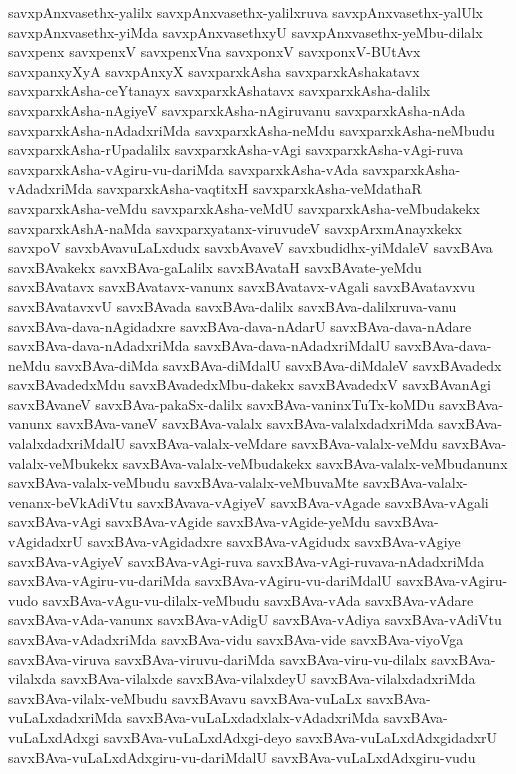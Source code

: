 {savxpAnxvasethx-yalilx
savxpAnxvasethx-yalilxruva
savxpAnxvasethx-yalUlx
savxpAnxvasethx-yiMda
savxpAnxvasethxyU
savxpAnxvasethx-yeMbu-dilalx
savxpenx
savxpenxV
savxpenxVna
savxponxV
savxponxV-BUtAvx
savxpanxyXyA
savxpAnxyX
savxparxkAsha
savxparxkAshakatavx
savxparxkAsha-ceYtanayx
savxparxkAshatavx
savxparxkAsha-dalilx
savxparxkAsha-nAgiyeV
savxparxkAsha-nAgiruvanu
savxparxkAsha-nAda
savxparxkAsha-nAdadxriMda
savxparxkAsha-neMdu
savxparxkAsha-neMbudu
savxparxkAsha-rUpadalilx
savxparxkAsha-vAgi
savxparxkAsha-vAgi-ruva
savxparxkAsha-vAgiru-vu-dariMda
savxparxkAsha-vAda
savxparxkAsha-vAdadxriMda
savxparxkAsha-vaqtitxH
savxparxkAsha-veMdathaR
savxparxkAsha-veMdu
savxparxkAsha-veMdU
savxparxkAsha-veMbudakekx
savxparxkAshA-naMda
savxparxyatanx-viruvudeV
savxpArxmAnayxkekx
savxpoV
savxbAvavuLaLxdudx
savxbAvaveV
savxbudidhx-yiMdaleV
savxBAva
savxBAvakekx
savxBAva-gaLalilx
savxBAvataH
savxBAvate-yeMdu
savxBAvatavx
savxBAvatavx-vanunx
savxBAvatavx-vAgali
savxBAvatavxvu
savxBAvatavxvU
savxBAvada
savxBAva-dalilx
savxBAva-dalilxruva-vanu
savxBAva-dava-nAgidadxre
savxBAva-dava-nAdarU
savxBAva-dava-nAdare
savxBAva-dava-nAdadxriMda
savxBAva-dava-nAdadxriMdalU
savxBAva-dava-neMdu
savxBAva-diMda
savxBAva-diMdalU
savxBAva-diMdaleV
savxBAvadedx
savxBAvadedxMdu
savxBAvadedxMbu-dakekx
savxBAvadedxV
savxBAvanAgi
savxBAvaneV
savxBAva-pakaSx-dalilx
savxBAva-vaninxTuTx-koMDu
savxBAva-vanunx
savxBAva-vaneV
savxBAva-valalx
savxBAva-valalxdadxriMda
savxBAva-valalxdadxriMdalU
savxBAva-valalx-veMdare
savxBAva-valalx-veMdu
savxBAva-valalx-veMbukekx
savxBAva-valalx-veMbudakekx
savxBAva-valalx-veMbudanunx
savxBAva-valalx-veMbudu
savxBAva-valalx-veMbuvaMte
savxBAva-valalx-venanx-beVkAdiVtu
savxBAvava-vAgiyeV
savxBAva-vAgade
savxBAva-vAgali
savxBAva-vAgi
savxBAva-vAgide
savxBAva-vAgide-yeMdu
savxBAva-vAgidadxrU
savxBAva-vAgidadxre
savxBAva-vAgidudx
savxBAva-vAgiye
savxBAva-vAgiyeV
savxBAva-vAgi-ruva
savxBAva-vAgi-ruvava-nAdadxriMda
savxBAva-vAgiru-vu-dariMda
savxBAva-vAgiru-vu-dariMdalU
savxBAva-vAgiru-vudo
savxBAva-vAgu-vu-dilalx-veMbudu
savxBAva-vAda
savxBAva-vAdare
savxBAva-vAda-vanunx
savxBAva-vAdigU
savxBAva-vAdiya
savxBAva-vAdiVtu
savxBAva-vAdadxriMda
savxBAva-vidu
savxBAva-vide
savxBAva-viyoVga
savxBAva-viruva
savxBAva-viruvu-dariMda
savxBAva-viru-vu-dilalx
savxBAva-vilalxda
savxBAva-vilalxde
savxBAva-vilalxdeyU
savxBAva-vilalxdadxriMda
savxBAva-vilalx-veMbudu
savxBAvavu
savxBAva-vuLaLx
savxBAva-vuLaLxdadxriMda
savxBAva-vuLaLxdadxlalx-vAdadxriMda
savxBAva-vuLaLxdAdxgi
savxBAva-vuLaLxdAdxgi-deyo
savxBAva-vuLaLxdAdxgidadxrU
savxBAva-vuLaLxdAdxgiru-vu-dariMdalU
savxBAva-vuLaLxdAdxgiru-vudu
}
